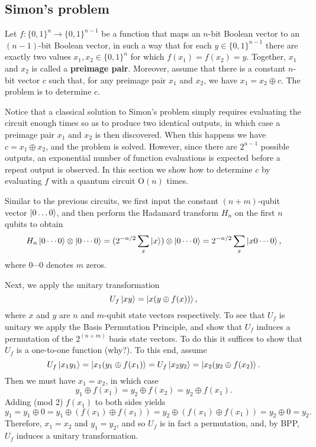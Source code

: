 \documentclass [12pt]{article}
\theoremstyle{definition}
\begin{document}
\newpage
\subsection*{Simon's problem}

Let $f:\{0,1\}^{n}\rightarrow \{0,1\}^{n-1}$ be a function that maps an $n$-bit Boolean vector to an $(n-1)$-bit Boolean vector, in such a way that for each $y\in\{0,1\}^{n-1}$
there are exactly two values $x_1,x_2\in \{0,1\}^n$ for which $f(x_1)=f(x_2)=y$. Together, $x_1$ and $x_2$ is called a \textbf{preimage pair}. Moreover, assume that there is 
a constant $n$-bit vector $c$ such that, for any preimage pair $x_1$ and $x_2$, we have $x_1 = x_2\oplus c$. The problem is to determine $c$. 

Notice that a classical solution to Simon's problem simply requires evaluating the circuit enough times so as to produce two identical outputs, in which case a preimage 
pair  $x_1$ and $x_2$ is then discovered. When this happens we have $c=x_1\oplus x_2$, and the problem is solved. However, since there are $2^{n-1}$ possible outputs,
an exponential number of function evaluations is expected before a repeat output is observed. In this section we show how to determine $c$ by evaluating $f$ with a quantum circuit 
$\mbox{O}(n)$ times.

Similar to the previous circuits, we first input the constant $(n+m)$-qubit vector $\ket{0\ldots 0}$, and then perform the Hadamard transform $H_{n}$ on the first $n$ qubits
to obtain 
\[H_n\ket{0\cdots 0}\otimes \ket{0\cdots 0} = (2^{-n/2}\sum_{x}\ket{x})\otimes \ket{0\cdots 0} = 2^{-n/2}\sum_{x}\ket{x0\cdots 0},\]
where $0\cdots 0$ denotes $m$ zeros. 

Next, we apply the unitary transformation 
\[U_f\ket{xy} = \ket{x(y\oplus f(x))},\]
where $x$ and $y$ are $n$ and $m$-qubit state vectors respectively. To see that $U_f$ is unitary we apply the Basis Permutation Principle, and show that $U_f$ induces a permutation
of the $2^{(n+m)}$ basis state vectors. To do this it suffices to show that $U_f$ is a one-to-one function (why?). To this end, assume
\[U_f\ket{x_1y_1} = \ket{x_1(y_1\oplus f(x_1)} = U_f\ket{x_2y_2} = \ket{x_2(y_2\oplus f(x_2)}.\]
Then we must have $x_1=x_2$, in which case 
\[y_1\oplus f(x_1) = y_2\oplus f(x_2) = y_2\oplus f(x_1).\]
Adding (mod 2) $f(x_1)$ to both sides yields
\[y_1 = y_1\oplus 0 = y_1\oplus  (f(x_1) \oplus f(x_1)) =  y_2\oplus (f(x_1) \oplus f(x_1)) = y_2\oplus 0 = y_2.\]
Therefore, $x_1=x_2$ and $y_1=y_2$, and so $U_f$ is in fact a permutation, and, by BPP, $U_f$ induces a unitary transformation.
\end{document}
